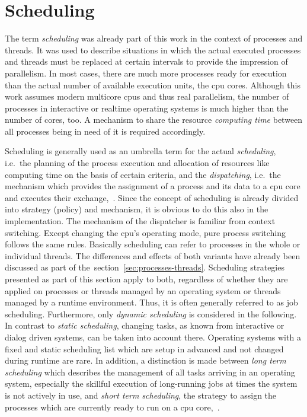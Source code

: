 %

\section{Scheduling}\label{sec:scheduling}
The term \textit{scheduling} was already part of this work in the context of processes and threads.
It was used to describe situations in which the actual executed processes and threads must be replaced at certain intervals to provide the impression of parallelism.
In most cases, there are much more processes ready for execution than the actual number of available execution units, the \ac{cpu} cores.
Although this work assumes modern multicore \acp{cpu} and thus real parallelism, the number of processes in interactive or realtime operating systems is much higher than the number of cores, too.
A mechanism to share the resource \textit{computing time} between all processes being in need of it is required accordingly.

Scheduling is generally used as an umbrella term for the actual \textit{scheduling}, i.e.\ the planning of the process execution and allocation of resources like computing time on the basis of certain criteria, and the \textit{dispatching}, i.e.\ the mechanism which provides the assignment of a process and its data to a \ac{cpu} core and executes their exchange\cite{brause2017betriebssysteme},~\cite{mandl2014Grundkurs}.
Since the concept of scheduling is already divided into strategy (policy) and mechanism, it is obvious to do this also in the implementation.
The mechanism of the dispatcher is familiar from context switching.
Except changing the \ac{cpu}'s operating mode, pure process switching follows the same rules.
Basically scheduling can refer to processes in the whole or individual threads\cite{mandl2014Grundkurs}.
The differences and effects of both variants have already been discussed as part of the~section~\ref{sec:processes-threads}.
Scheduling strategies presented as part of this section apply to both, regardless of whether they are applied on processes or threads managed by an operating system or threads managed by a runtime environment.
Thus, it is often generally referred to as job scheduling\cite{mandl2014Grundkurs}.
Furthermore, only \textit{dynamic scheduling} is considered in the following.
In contrast to \textit{static scheduling}, changing tasks, as known from interactive or dialog driven systems, can be taken into account there.
Operating systems with a fixed and static scheduling list which are setup in advanced and not changed during runtime are rare\cite{brause2017betriebssysteme}.
In addition, a distinction is made between \textit{long term scheduling} which describes the management of all tasks arriving in an operating system, especially the skillful execution of long-running jobs at times the system is not actively in use, and \textit{short term scheduling}, the strategy to assign the processes which are currently ready to run on a \ac{cpu} core\cite{brause2017betriebssysteme},~\cite{mandl2014Grundkurs}.

